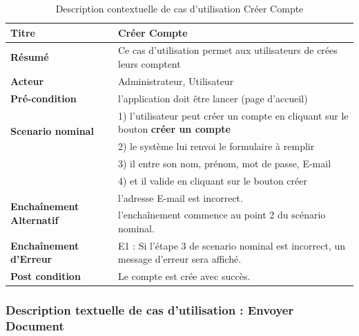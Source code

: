 \documentclass[12pt,a4paper]{article}
\begin{document}
			\begin{table}[H]
				\centering
					\caption{Description contextuelle de cas d'utilisation Créer Compte}
				\begin{tabular}{|l|p{11cm}|}
					\hline 
						\textbf{Titre} & Créer Compte \\ 
					\hline 
						\textbf{Résumé} & Ce cas d'utilisation permet aux utilisateurs de crées leurs comptent \\ 
					\hline 
						\textbf{Acteur} & Administrateur, Utilisateur \\ 
			
					\hline 
						\textbf{Pré-condition} & l'application doit être lancer (page d'accueil)  \\ 
					\hline 
						\multirow{2}{*}{\textbf{Scenario nominal}} & 1) l'utilisateur peut créer un compte en cliquant sur le bouton \textbf{créer un compte} \\
							 & 2) le système lui renvoi le formulaire à remplir \\
							 & 3) il entre son nom, prénom, mot de passe, E-mail \\
							 & 4) et il valide en cliquant sur le bouton créer\\
					\hline 
					
						\multirow{2}{*}{\textbf{Enchaînement Alternatif}} & l'adresse E-mail est incorrect. \\
							  & l'enchaînement commence au point 2 du scénario nominal. \\
							
					\hline 
						\textbf{Enchaînement d'Erreur} & E1 : Si l'étape 3 de scenario nominal est incorrect, un message d'erreur sera affiché. \\
					\hline
						\textbf{Post condition} & Le compte est crée avec succès.\\
					\hline	
			\end{tabular} 
		\end{table}
	
	
	\subsubsection{Description textuelle de cas d'utilisation : Envoyer Document}
\end{document}
